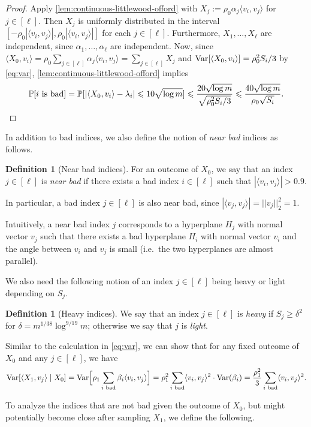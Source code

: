 \documentclass[reqno]{amsart}
\theoremstyle{remark}
\theoremstyle{definition}
\newtheorem{definition}[theorem]{Definition}
\numberwithin{theorem}{section}
\renewcommand{\(}{\bigl(}
\renewcommand{\)}{\bigr)\vphantom{)}}
\renewcommand{\le}{\leqslant}
\renewcommand{\ge}{\geqslant}
\renewcommand{\P}{\mathbb{P}}
\newcommand{\ang}[1]{\langle#1\rangle}
\newcommand{\var}{\textup{Var}}
\begin{document}
\begin{proof}
    Apply \cref{lem:continuous-littlewood-offord} with $X_j := \rho_0\alpha_j \ang{v_i,v_j}$ for $j\in [\ell]$. Then $X_j$ is uniformly distributed in the interval $[-\rho_0|\ang{v_i,v_j}|,\rho_0|\ang{v_i,v_j}|]$ for each $j\in [\ell]$. Furthermore, $X_1,\dots, X_\ell$ are independent, since $\alpha_1,\dots, \alpha_\ell$ are independent. Now, since $\ang{X_0, v_i} = \rho_0\sum_{j\in [\ell]}\alpha_j \ang{v_i,v_j} = \sum_{j\in [\ell]}X_j$ and $\var[\ang{X_0, v_i}] = \rho_0^2S_i/3$ by \eqref{eq:var},  \cref{lem:continuous-littlewood-offord} implies
    \[\P[i \text{ is bad}] = \P[|\ang{X_0,v_i} - \lambda_i|\le 10\sqrt{\log m}]\le \frac{20\sqrt{\log m}}{\sqrt{\rho_0^2S_i/3}}\le \frac{40\sqrt{\log m}}{\rho_0\sqrt{S_i}}. \qedhere \]
\end{proof}

In addition to bad indices, we also define the notion of \emph{near bad} indices as follows.
\begin{definition}[Near bad indices]
    For an outcome of $X_0$, we say that an index $j\in [\ell]$ is \emph{near bad} if there exists a bad index $i\in [\ell]$ such that $|\ang{v_i, v_j}| > 0.9$. 
\end{definition}
In particular, a bad index $j\in [\ell]$ is also near bad, since $|\ang{v_j, v_j}| = ||v_j||_2^2=1$.

Intuitively, a near bad index $j$ corresponds to a hyperplane $H_j$ with normal vector $v_j$ such that there exists a bad hyperplane $H_i$ with normal vector $v_i$ and the angle between $v_i$ and $v_j$ is small (i.e.\ the two hyperplanes are almost parallel).

We also need the following notion of an index $j\in [\ell]$ being heavy or light depending on $S_j$.
\begin{definition}[Heavy indices]\label{def:heavy}
    We say that an index $j\in [\ell]$ is \emph{heavy} if $S_j \ge \delta^2$ for $\delta = m^{1/38}\log^{9/19}m$; otherwise we say that $j$ is \emph{light}.
\end{definition}

Similar to the calculation in \eqref{eq:var}, we can show that for any fixed outcome of $X_0$ and any $j\in [\ell]$, we have
\[    \var[\ang{X_1, v_j}\mid X_0] = \var\Big[\rho_1\sum_{i\text{ bad}}\beta_i\ang{v_i,v_j}\Big] = \rho_1^2\sum_{i\text{ bad}}\ang{v_i,v_j}^2\cdot \var(\beta_i) =\frac{\rho_1^2}{3}\sum_{i\text{ bad}}\ang{v_i,v_j}^2.\]

To analyze the indices that are not bad given the outcome of $X_0$, but might potentially become close after sampling $X_1$, we define the following.
\end{document}
